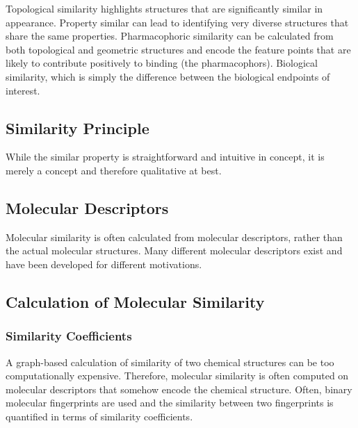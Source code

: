 Topological similarity highlights structures that are significantly similar in appearance. Property similar can lead to identifying very diverse structures that share the same properties. Pharmacophoric similarity can be calculated from both topological and geometric structures and encode the feature points that are likely to contribute positively to binding (the pharmacophors). Biological similarity, which is simply the difference between the biological endpoints of interest.


\subsection{Similarity Principle}


While the similar property is straightforward and intuitive in concept, it is merely a concept and therefore qualitative at best.


\subsection{Molecular Descriptors}

Molecular similarity is often calculated from molecular descriptors, rather than the actual molecular structures. Many different molecular descriptors exist and have been developed for different motivations.


\subsection{Calculation of Molecular Similarity}

\subsubsection*{Similarity Coefficients}

A graph-based calculation of similarity of two chemical structures can be too computationally expensive. Therefore, molecular similarity is often computed on molecular descriptors that somehow encode the chemical structure. Often, binary molecular fingerprints are used and the similarity between two fingerprints is quantified in terms of similarity coefficients.


